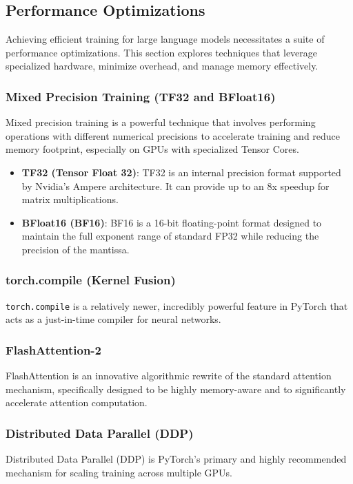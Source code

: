 \subsection{Performance Optimizations}
Achieving efficient training for large language models necessitates a suite of performance optimizations. This section explores techniques that leverage specialized hardware, minimize overhead, and manage memory effectively.

\subsubsection{Mixed Precision Training (TF32 and BFloat16)}
Mixed precision training is a powerful technique that involves performing operations with different numerical precisions to accelerate training and reduce memory footprint, especially on GPUs with specialized Tensor Cores.

\begin{itemize}
    \item \textbf{TF32 (Tensor Float 32)}: TF32 is an internal precision format supported by Nvidia's Ampere architecture. It can provide up to an 8x speedup for matrix multiplications.
    \item \textbf{BFloat16 (BF16)}: BF16 is a 16-bit floating-point format designed to maintain the full exponent range of standard FP32 while reducing the precision of the mantissa.
\end{itemize}

\subsubsection{torch.compile (Kernel Fusion)}
\texttt{torch.compile} is a relatively newer, incredibly powerful feature in PyTorch that acts as a just-in-time compiler for neural networks.

\subsubsection{FlashAttention-2}
FlashAttention is an innovative algorithmic rewrite of the standard attention mechanism, specifically designed to be highly memory-aware and to significantly accelerate attention computation.

\subsubsection{Distributed Data Parallel (DDP)}
Distributed Data Parallel (DDP) is PyTorch's primary and highly recommended mechanism for scaling training across multiple GPUs.

